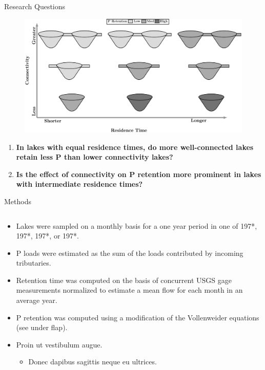 \documentclass[final,hyperref={pdfpagelabels=false}]{beamer}
\begin{document}
\begin{frame}[t]
\begin{columns}[t]
\begin{column}{.465\textwidth}
{\begin{block}{Research Questions}
\begin{figure}
\includegraphics[width=\linewidth]{conny_framework.png}
\end{figure}

\begin{enumerate} \large 
\item \textbf{In lakes with equal residence times, do more well-connected lakes retain less P than lower connectivity lakes?}
\item \textbf{Is the effect of connectivity on P retention more prominent in lakes with intermediate residence times?}
\end{enumerate}

\end{block}
}

\begin{block}{Methods}

\begin{columns} %
\begin{column}{\textwidth} %
\begin{itemize}
\item Lakes were sampled on a monthly basis for a one year period in one of 197*, 197*, 197*, or 197*.
\item P loads were estimated as the sum of the loads contributed by incoming tributaries.
\item Retention time was computed on the basis of concurrent USGS gage measurements normalized to estimate a mean flow for each month in an average year.
\item P retention was computed using a modification of the Vollenweider equations (see under flap).
\item Proin ut vestibulum augue.
\begin{itemize}
\item Donec dapibus sagittis neque eu ultrices.
\end{itemize}
\end{itemize}
\end{column}


\end{columns}
\end{block}
\end{column}
\end{columns}
\end{frame}
\end{document}
